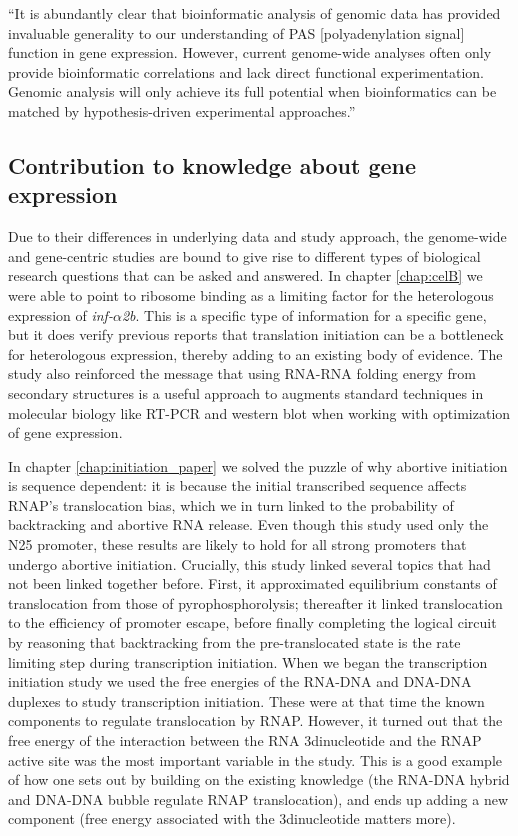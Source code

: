 ``It is abundantly clear that bioinformatic analysis of genomic data has
provided invaluable generality to our understanding of PAS [polyadenylation
signal] function in gene expression. However, current genome-wide analyses
often only provide bioinformatic correlations and lack direct functional
experimentation. Genomic analysis will only achieve its full potential when
bioinformatics can be matched by hypothesis-driven experimental approaches.''

\subsection{Contribution to knowledge about gene expression} Due to their
differences in underlying data and study approach, the genome-wide and
gene-centric studies are bound to give rise to different types of biological
research questions that can be asked and answered. In chapter \ref{chap:celB}
we were able to point to ribosome binding as a limiting factor for the
heterologous expression of \textit{inf-$\alpha$2b}. This is a specific type of
information for a specific gene, but it does verify previous reports that
translation initiation can be a bottleneck for heterologous expression, thereby
adding to an existing body of evidence. The study also reinforced the message
that using RNA-RNA folding energy from secondary structures is a useful
approach to augments standard techniques in molecular biology like RT-PCR and
western blot when working with optimization of gene expression.

In chapter \ref{chap:initiation_paper} we solved the puzzle of why abortive
initiation is sequence dependent: it is because the initial transcribed
sequence affects RNAP's translocation bias, which we in turn linked to the
probability of backtracking and abortive RNA release. Even though this study
used only the N25 promoter, these results are likely to hold for all strong
promoters that undergo abortive initiation. Crucially, this study linked
several topics that had not been linked together before. First, it approximated
equilibrium constants of translocation from those of pyrophosphorolysis;
thereafter it linked translocation to the efficiency of promoter escape, before
finally completing the logical circuit by reasoning that backtracking from the
pre-translocated state is the rate limiting step during transcription
initiation. When we began the transcription initiation study we used the free
energies of the RNA-DNA and DNA-DNA duplexes to study transcription initiation.
These were at that time the known components to regulate translocation by RNAP.
However, it turned out that the free energy of the interaction between the RNA
3\ppp dinucleotide and the RNAP active site was the most important variable in
the study. This is a good example of how one sets out by building on the
existing knowledge (the RNA-DNA hybrid and DNA-DNA bubble regulate RNAP
translocation), and ends up adding a new component (free energy associated with
the 3\ppp dinucleotide matters more).

